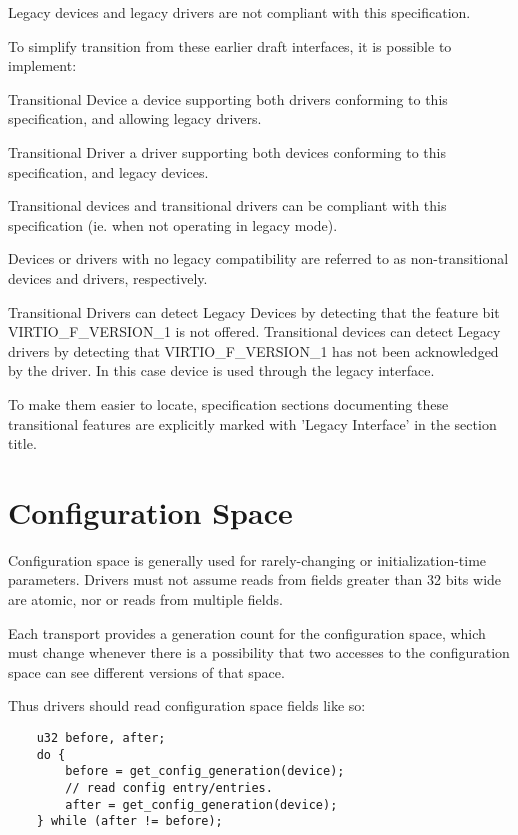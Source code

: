 Legacy devices and legacy drivers are not compliant with this
specification.

To simplify transition from these earlier draft interfaces,
it is possible to implement:

Transitional Device
        a device supporting both drivers conforming to this
        specification, and allowing legacy drivers.

Transitional Driver
        a driver supporting both devices conforming to this
        specification, and legacy devices.

Transitional devices and transitional drivers can be compliant with
this specification (ie. when not operating in legacy mode).

Devices or drivers with no legacy compatibility are referred to as
non-transitional devices and drivers, respectively.

Transitional Drivers can detect Legacy Devices by detecting that
the feature bit VIRTIO_F_VERSION_1 is not offered.
Transitional devices can detect Legacy drivers by detecting that
VIRTIO_F_VERSION_1 has not been acknowledged by the driver.
In this case device is used through the legacy interface.

To make them easier to locate, specification sections documenting
these transitional features are explicitly marked with 'Legacy
Interface' in the section title.

\section{Configuration Space}\label{sec:Basic Facilities of a Virtio Device / Configuration Space}

Configuration space is generally used for rarely-changing or
initialization-time parameters.  Drivers must not assume reads from
fields greater than 32 bits wide are atomic, nor or reads from
multiple fields.

Each transport provides a generation count for the configuration
space, which must change whenever there is a possibility that two
accesses to the configuration space can see different versions of that
space.

Thus drivers should read configuration space fields like so:

\begin{lstlisting}
	u32 before, after;
	do {
		before = get_config_generation(device);
		// read config entry/entries.
		after = get_config_generation(device);
	} while (after != before);
\end{lstlisting}

